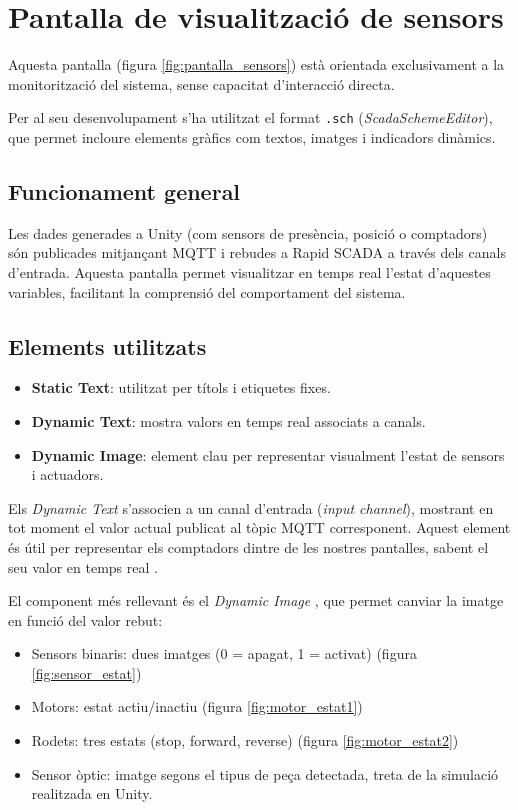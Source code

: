 \documentclass[12pt,a4paper]{report}
\begin{document}
\section{Pantalla de visualització de sensors}

Aquesta pantalla (figura \ref{fig:pantalla_sensors}) està orientada exclusivament a la monitorització del sistema, sense capacitat d'interacció directa.

Per al seu desenvolupament s'ha utilitzat el format \texttt{.sch} (\textit{ScadaSchemeEditor}), que permet incloure elements gràfics com textos, imatges i indicadors dinàmics.

\subsection{Funcionament general}

Les dades generades a Unity (com sensors de presència, posició o comptadors) són publicades mitjançant MQTT i rebudes a Rapid SCADA a través dels canals d'entrada. Aquesta pantalla permet visualitzar en temps real l'estat d'aquestes variables, facilitant la comprensió del comportament del sistema.

\subsection{Elements utilitzats}

\begin{itemize}
    \item \textbf{Static Text}: utilitzat per títols i etiquetes fixes.
    \item \textbf{Dynamic Text}: mostra valors en temps real associats a canals.
    \item \textbf{Dynamic Image}: element clau per representar visualment l'estat de sensors i actuadors.
\end{itemize}

Els \textit{Dynamic Text} s'associen a un canal d'entrada (\textit{input channel}), mostrant en tot moment el valor actual publicat al tòpic MQTT corresponent. Aquest element és útil per representar els comptadors dintre de les nostres pantalles, sabent el seu valor en temps real \cite{RapidScadaVideos} . 


El component més rellevant és el \textit{Dynamic Image} , que permet canviar la imatge en funció del valor rebut:

\begin{itemize}
    \item Sensors binaris: dues imatges (0 = apagat, 1 = activat) (figura \ref{fig:sensor_estat})
    \item Motors: estat actiu/inactiu (figura \ref{fig:motor_estat1})
    \item Rodets: tres estats (stop, forward, reverse) (figura \ref{fig:motor_estat2})
    \item Sensor òptic: imatge segons el tipus de peça detectada, treta de la simulació realitzada en Unity. 
\end{itemize}
\end{document}
